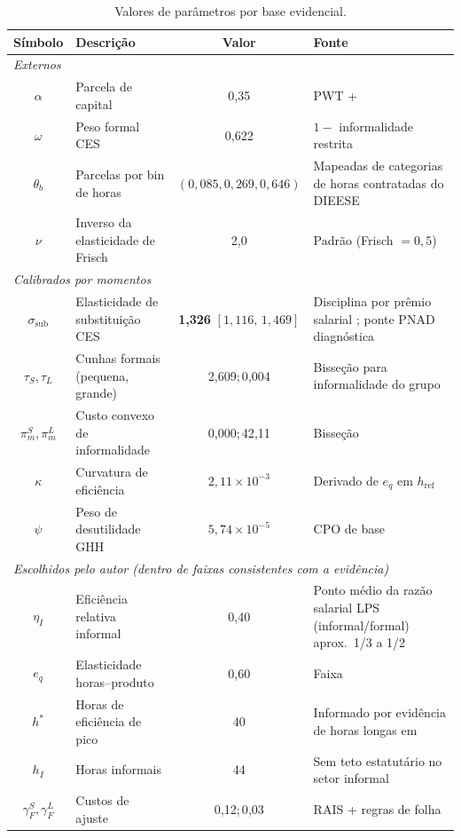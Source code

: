 \documentclass[10pt,twocolumn]{article}
\begin{document}
\begin{table}[t]
\centering
\caption{Valores de par\^ametros por base evidencial.}\label{tab:params}
\small
\begin{tabular}{@{}c p{3.1cm} c p{6.1cm}@{}}
\hline\hline
S\'imbolo & Descri\c{c}\~ao & Valor & Fonte \\
\hline
\multicolumn{4}{l}{\textit{Externos}} \\
\hline
$\alpha$     & Parcela de capital             & 0{,}35   & PWT + \citet{Gollin2002} \\
$\omega$     & Peso formal CES                & 0{,}622  & $1-$ informalidade restrita \citep{PNAD2025} \\
$\theta_b$   & Parcelas por bin de horas      & $(0{,}085, 0{,}269, 0{,}646)$ & Mapeadas de categorias de horas contratadas do DIEESE \citep{DIEESE2024} \\
$\nu$        & Inverso da elasticidade de Frisch & 2{,}0 & Padr\~ao (Frisch $=0{,}5$) \\
\hline
\multicolumn{4}{l}{\textit{Calibrados por momentos}} \\
\hline
$\sigma_{\text{sub}}$ & Elasticidade de substitui\c{c}\~ao CES & \textbf{1{,}326} $[1{,}116,\,1{,}469]$ & Disciplina por pr\^emio salarial \citep{MeghirNaritaRobin2015}; ponte PNAD diagn\'ostica \citep{PNAD2025} \\
$\tau_S,\tau_L$       & Cunhas formais (pequena, grande) & 2{,}609;\,0{,}004 & Bisse\c{c}\~ao para informalidade do grupo \\
$\pi_m^S,\pi_m^L$     & Custo convexo de informalidade   & 0{,}000;\,42{,}11 & Bisse\c{c}\~ao \\
$\kappa$               & Curvatura de efici\^encia & $2{,}11\times 10^{-3}$ & Derivado de $e_q$ em $h_{\text{ref}}$ \\
$\psi$                 & Peso de desutilidade GHH & $5{,}74\times 10^{-5}$ & CPO de base \\
\hline
\multicolumn{4}{l}{\textit{Escolhidos pelo autor (dentro de faixas consistentes com a evid\^encia)}} \\
\hline
$\eta_I$      & Efici\^encia relativa informal & 0{,}40   & Ponto m\'edio da raz\~ao salarial LPS (informal/formal) aprox.\ 1/3 a 1/2 \\
$e_q$          & Elasticidade horas--produto    & 0{,}60   & Faixa \citet{Pencavel2015} \\
$h^*$          & Horas de efici\^encia de pico  & 40       & Informado por evid\^encia de horas longas em \citet{Pencavel2015} \\
$h_I$          & Horas informais                & 44       & Sem teto estatut\'ario no setor informal \\
$\gamma_F^S, \gamma_F^L$ & Custos de ajuste         & 0{,}12;\,0{,}03 & RAIS + regras de folha \citep{RAIS2022,BrasilLei8212,ReceitaESocialRural2021} \\
\hline\hline
\end{tabular}
\end{table}
\end{document}
